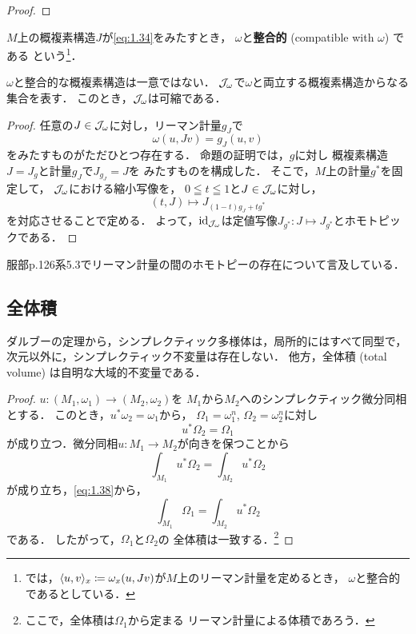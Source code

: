 \begin{proof}
    
\end{proof}

\(M\)上の概複素構造\(J\)が\eqref{eq:1.34}をみたすとき，
\(\omega\)と\textbf{整合的} (compatible with \(\omega\)) である
という\footnote{
    \cite[4.1]{MS17}では，\(
        \inner<u,v>_{x}\coloneqq \omega_{x}(u,Jv)
    \)が\(M\)上のリーマン計量を定めるとき，
    \(\omega\)と整合的であるとしている．
}．

\(\omega\)と整合的な概複素構造は一意ではない．
\(\acstr[M]{\omega}\)で\(\omega\)と両立する概複素構造からなる集合を表す．
このとき，\(\acstr[M]{\omega}\)は可縮である．

\begin{proof}
    任意の\(J\in\acstr[M]{\omega}\)に対し，リーマン計量\(g_J\)で
    \[
        \omega(u,Jv)=g_J(u,v)
    \]をみたすものがただひとつ存在する．
    命題の証明では，\(g\)に対し
    概複素構造\(J=J_{g}\)と計量\(g_J\)で\(J_{g_J}=J\)を
    みたすものを構成した．
    そこで，\(M\)上の計量\(g^{\ast}\)を固定して，
    \(\acstr[M]{\omega}\)における縮小写像を，
    \(0\leqq t\leqq 1\)と\(J\in\acstr[M]{\omega}\)に対し，
    \[
        (t,J)\mapsto J_{(1-t)g_{J}+tg^{\ast}}
    \]
    を対応させることで定める．
    よって，\(\id_{\acstr[M]{\omega}}\)は定値写像\(
        J_{g^{\ast}}\colon J\mapsto J_{g^{\ast}}
    \)とホモトピックである．
\end{proof}

\begin{CMT}
    服部p.126系5.3でリーマン計量の間のホモトピーの存在について言及している．
\end{CMT}

\subsection*{全体積}
ダルブーの定理から，シンプレクティック多様体は，局所的にはすべて同型で，
次元以外に，シンプレクティック不変量は存在しない．
他方，全体積 (total volume) は自明な大域的不変量である．
\begin{proof}
    \(u\colon (M_1,\omega_1) \to (M_2,\omega_2)\)を
    \(M_1\)から\(M_2\)へのシンプレクティック微分同相とする．
    このとき，\(u^{\ast}\omega_2=\omega_1\)から，
    \(\varOmega_1=\omega_1^n\), \(\varOmega_2=\omega_2^n\)に対し
    \begin{equation}
        u^{\ast}\varOmega_2=\varOmega_1\label{eq:1.38}
    \end{equation}
    が成り立つ．微分同相\(u\colon M_1\to M_2\)が向きを保つことから
    \[
        \int_{M_1}^{}u^{\ast}\varOmega_{2}=
        \int_{M_2}^{}u^{\ast}\varOmega_{2}
    \]が成り立ち，\eqref{eq:1.38}から，
    \[
        \int_{M_1}^{}\varOmega_{1}=
        \int_{M_2}^{}u^{\ast}\varOmega_{2}
    \]
    である．
    したがって，\(\varOmega_{1}\)と\(\varOmega_{2}\)の
    全体積は一致する．\footnote{
        ここで，全体積は\(\varOmega_1\)から定まる
        リーマン計量による体積であろう．
    }
\end{proof}
